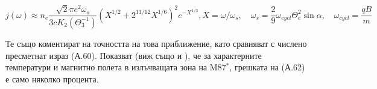 \begin{appendices}
\begin{subequations}
	\begin{equation}
		j(\omega)\approx n_e \frac{\sqrt{2}\pi e^2 \omega_s}{3cK_2(\Theta_3^{-1})}\left(X^{1/2} + 2^{11/12}X^{1/6}\right)^2e^{-X^{1/3}},
	\end{equation}
	\begin{equation}
		X = \omega / \omega_s,\quad \omega_s = \frac{2}{9}\omega_{cycl}\Theta_e^2\sin\alpha,\quad \omega_{cycl} = \frac{qB}{m}
	\end{equation}
\end{subequations}

Те също коментират на точността на това приближение, като сравняват с числено пресметнат израз (А.60). Показват (виж също и \cite{Vincent2022}), че за характерните температури и магнитно полета в излъчващата зона на M87$^*$, грешката на (А.62) е само няколко процента.

\end{appendices}

